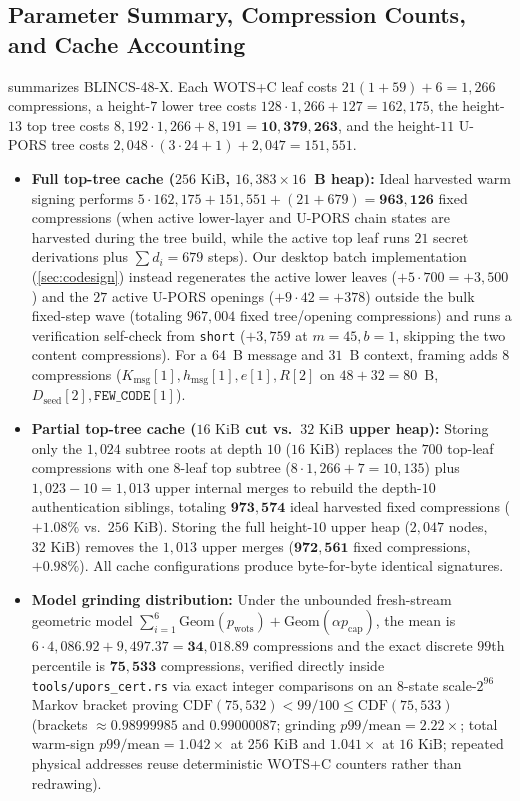 \documentclass[11pt,a4paper]{article}
\theoremstyle{definition}
\theoremstyle{remark}
\newcommand{\BLINCS}{\textsf{BLINCS-48-X}}
\newcommand{\WOTSC}{\textsf{WOTS+C}}
\newcommand{\UPORS}{\textsf{U-PORS}}
\begin{document}
\subsection{Parameter Summary, Compression Counts, and Cache Accounting}
 summarizes \BLINCS{}. Each \WOTSC{} leaf costs $21(1 + 59) + 6 = 1{,}266$ compressions, a height-$7$ lower tree costs $128 \cdot 1{,}266 + 127 = 162{,}175$, the height-$13$ top tree costs $8{,}192 \cdot 1{,}266 + 8{,}191 = \mathbf{10{,}379{,}263}$, and the height-$11$ \UPORS{} tree costs $2{,}048 \cdot (3 \cdot 24 + 1) + 2{,}047 = 151{,}551$.
\begin{itemize}[leftmargin=1.4em,itemsep=1pt]
  \item \textbf{Full top-tree cache ($256\text{ KiB}$, $16{,}383 \times 16$~B heap):} Ideal harvested warm signing performs $5 \cdot 162{,}175 + 151{,}551 + (21 + 679) = \mathbf{963{,}126}$ fixed compressions (when active lower-layer and \UPORS{} chain states are harvested during the tree build, while the active top leaf runs $21$ secret derivations plus $\sum d_i = 679$ steps). Our desktop batch implementation (\cref{sec:codesign}) instead regenerates the active lower leaves ($+5 \cdot 700 = +3{,}500$) and the $27$ active \UPORS{} openings ($+9 \cdot 42 = +378$) outside the bulk fixed-step wave (totaling $967{,}004$ fixed tree/opening compressions) and runs a verification self-check from \texttt{short} ($+3{,}759$ at $m=45,b=1$, skipping the two content compressions). For a $64$~B message and $31$~B context, framing adds $8$ compressions ($K_{\mathrm{msg}}[1], h_{\mathrm{msg}}[1], e[1], R[2]$ on $48+32=80$~B, $D_{\mathrm{seed}}[2], \mathtt{FEW\_CODE}[1]$).
  \item \textbf{Partial top-tree cache ($16\text{ KiB}$ cut vs.\ $32\text{ KiB}$ upper heap):} Storing only the $1{,}024$ subtree roots at depth $10$ ($16\text{ KiB}$) replaces the $700$ top-leaf compressions with one $8$-leaf top subtree ($8 \cdot 1{,}266 + 7 = 10{,}135$) plus $1{,}023 - 10 = 1{,}013$ upper internal merges to rebuild the depth-$10$ authentication siblings, totaling $\mathbf{973{,}574}$ ideal harvested fixed compressions ($+1.08\%$ vs.\ $256\text{ KiB}$). Storing the full height-$10$ upper heap ($2{,}047$ nodes, $32\text{ KiB}$) removes the $1{,}013$ upper merges ($\mathbf{972{,}561}$ fixed compressions, $+0.98\%$). All cache configurations produce byte-for-byte identical signatures.
  \item \textbf{Model grinding distribution:} Under the unbounded fresh-stream geometric model $\sum_{i=1}^{6}\mathrm{Geom}(p_{\mathrm{wots}}) + \mathrm{Geom}(\alpha p_{\mathrm{cap}})$, the mean is $6 \cdot 4{,}086.92 + 9{,}497.37 = \mathbf{34{,}018.89}$ compressions and the exact discrete $99$th percentile is $\mathbf{75{,}533}$ compressions, verified directly inside \texttt{tools/upors\_cert.rs} via exact integer comparisons on an $8$-state scale-$2^{96}$ Markov bracket proving $\mathrm{CDF}(75{,}532) < 99/100 \le \mathrm{CDF}(75{,}533)$ (brackets $\approx 0.98999985$ and $0.99000087$; grinding $p99/\text{mean} = 2.22\times$; total warm-sign $p99/\text{mean} = 1.042\times$ at $256\text{ KiB}$ and $1.041\times$ at $16\text{ KiB}$; repeated physical addresses reuse deterministic \WOTSC{} counters rather than redrawing).

\end{itemize}
\end{document}
